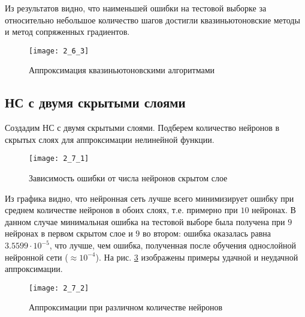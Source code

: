 Из результатов видно, что наименьшей ошибки на тестовой выборке за относительно небольшое количество шагов достигли квазиньютоновские методы и метод сопряженных градиентов.

\begin{figure}[H]
\begin{center}
	\texttt{[image: 2\_6\_3]}
	\caption{Аппроксимация квазиньютоновскими алгоритмами}
	\label{fig:2_6_3}
\end{center}
\end{figure}
\vspace{-1cm}

\subsection{НС с двумя скрытыми слоями}


Создадим НС с двумя скрытыми слоями. Подберем количество нейронов в скрытых слоях для аппроксимации нелинейной функции.
\vspace{-1cm}
\begin{figure}[H]
\begin{center}
	\texttt{[image: 2\_7\_1]}
	\caption{Зависимость ошибки от числа нейронов скрытом слое}
	\label{fig:2_7_1}
\end{center}
\end{figure}

Из графика видно, что нейронная сеть лучше всего минимизирует ошибку при среднем количестве нейронов в обоих слоях, т.е. примерно при $10$ нейронах. В данном случае минимальная ошибка на тестовой выборе была получена при $9$ нейронах в первом скрытом слое и $9$ во втором: ошибка оказалась равна $3.5599\cdot 10^{-5}$, что лучше, чем ошибка, полученная после обучения однослойной нейронной сети ($\approx 10^{-4}$). На рис. \ref{fig:2_7_2} изображены примеры удачной и неудачной аппроксимации.

\begin{figure}[H]
\begin{center}
	\texttt{[image: 2\_7\_2]}
	\caption{Аппроксимации при различном количестве нейронов}
	\label{fig:2_7_2}
\end{center}
\end{figure}

